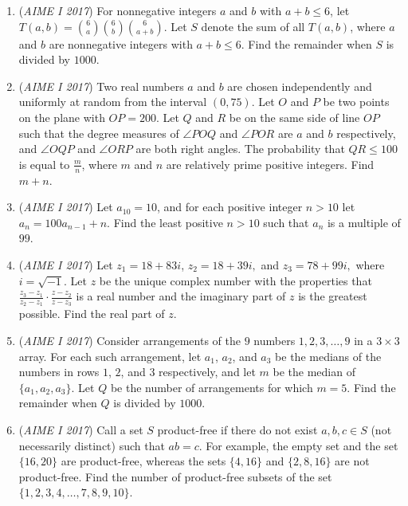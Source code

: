 \begin{enumerate}
 

	\item (\textit{AIME I 2017}) For nonnegative integers $a$ and $b$ with  $a + b \leq 6$, let $T(a, b) = \binom{6}{a} \binom{6}{b} \binom{6}{a + b}$. Let $S$ denote the sum of all $T(a, b)$, where  $a$ and $b$ are nonnegative integers with $a + b \leq 6$. Find the remainder when $S$ is divided by $1000$.


 

	\item (\textit{AIME I 2017}) Two real numbers $a$ and $b$ are chosen independently and uniformly at random from the interval $(0, 75)$. Let $O$ and $P$ be two points on the plane with $OP = 200$. Let $Q$ and $R$ be on the same side of line $OP$ such that the degree measures of $\angle POQ$ and $\angle POR$ are $a$ and $b$ respectively, and $\angle OQP$ and $\angle ORP$ are both right angles. The probability that $QR \leq 100$ is equal to $\frac{m}{n}$, where $m$ and $n$ are relatively prime positive integers. Find $m + n$.


 

	\item (\textit{AIME I 2017}) Let $a_{10} = 10$, and for each positive integer $n >10$ let $a_n = 100a_{n - 1} + n$. Find the least positive $n > 10$ such that $a_n$ is a multiple of $99$.


 

	\item (\textit{AIME I 2017}) Let $z_1 = 18 + 83i$, $z_2 = 18 + 39i,$ and $z_3 = 78 + 99i,$ where $i = \sqrt{-1}$. Let $z$ be the unique complex number with the properties that $\frac{z_3 - z_1}{z_2 - z_1} \cdot \frac{z - z_2}{z - z_3}$ is a real number and the imaginary part of $z$ is the greatest possible. Find the real part of $z$.


 

	\item (\textit{AIME I 2017}) Consider arrangements of the $9$ numbers $1, 2, 3, \dots, 9$ in a $3 \times 3$ array. For each such arrangement, let $a_1$, $a_2$, and $a_3$ be the medians of the numbers in rows $1$, $2$, and $3$ respectively, and let $m$ be the median of $\{a_1, a_2, a_3\}$. Let $Q$ be the number of arrangements for which $m = 5$. Find the remainder when $Q$ is divided by $1000$.


 

	\item (\textit{AIME I 2017}) Call a set $S$ product-free if there do not exist $a, b, c \in S$ (not necessarily distinct) such that $a b = c$. For example, the empty set and the set $\{16, 20\}$ are product-free, whereas the sets $\{4, 16\}$ and $\{2, 8, 16\}$ are not product-free. Find the number of product-free subsets of the set $\{1, 2, 3, 4, \ldots, 7, 8, 9, 10\}$.



\end{enumerate}
